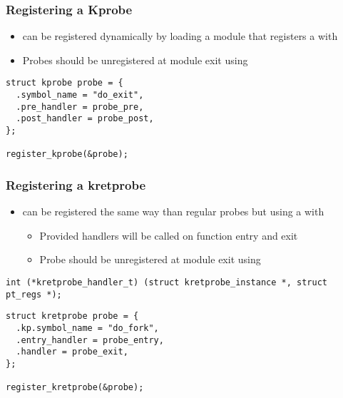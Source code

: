 \begin{frame}[fragile]
  \frametitle{Registering a Kprobe}
  \begin{itemize}
    \item {} can be registered dynamically by loading a module that
          registers a  with 
    \item Probes should be unregistered at module exit using
  \end{itemize}

  \begin{block}{}
    \begin{verbatim}
struct kprobe probe = {
  .symbol_name = "do_exit",
  .pre_handler = probe_pre,
  .post_handler = probe_post,
};

register_kprobe(&probe);
    \end{verbatim}
  \end{block}
\end{frame}

\begin{frame}[fragile]
  \frametitle{Registering a kretprobe}
  \begin{itemize}
    \item {} can be registered the same way than regular probes but using
          a  with 
    \begin{itemize}
      \item Provided handlers will be called on function entry and exit
      \item Probe should be unregistered at module exit using
    \end{itemize}
  \end{itemize}

  \begin{block}{}
    \begin{verbatim}
int (*kretprobe_handler_t) (struct kretprobe_instance *, struct pt_regs *);
    \end{verbatim}
  \end{block}

  \begin{block}{}
    \begin{verbatim}
struct kretprobe probe = {
  .kp.symbol_name = "do_fork",
  .entry_handler = probe_entry,
  .handler = probe_exit,
};

register_kretprobe(&probe);
    \end{verbatim}
  \end{block}
\end{frame}

